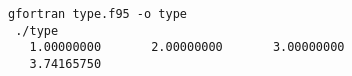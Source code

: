 \begin{Verbatim}[frame=lines,label=type - commands and output]
 gfortran type.f95 -o type
 ./type
   1.00000000       2.00000000       3.00000000    
   3.74165750    
\end{Verbatim}
